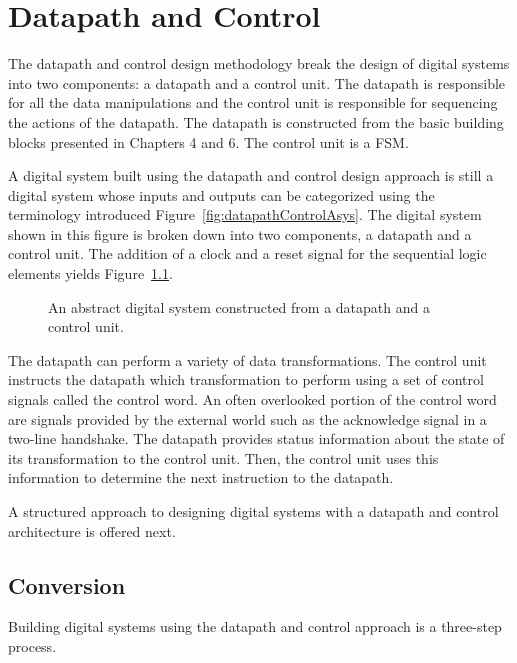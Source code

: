 \chapter{Datapath and Control}
\label{chapter:Datapath and Control}
\graphicspath{ {./chapter08/Fig} }

The datapath and control design methodology break the design
of digital systems into two components: a datapath and a control 
unit.  The datapath is responsible for all the data manipulations
and the control unit is responsible for sequencing the
actions of the datapath.  The datapath is constructed from the basic 
building blocks presented in Chapters 4 and 6.  The control unit is
a FSM.  

A digital system built using the datapath and control design approach
is still a digital system whose inputs and outputs can be categorized
using the terminology introduced Figure~\ref{fig:datapathControlAsys}.  The 
digital system shown in this figure is broken down into two components,
a datapath and a control unit.  The addition of a clock and a reset signal for the 
sequential logic elements yields Figure~\ref{fig:datapathControlAbstract}.

\begin{figure}[ht]
\caption{An abstract digital system constructed from a datapath and
a control unit.}
\label{fig:datapathControlAbstract}
\end{figure}
\label{page:Abstract}

The datapath can perform a variety of data transformations.  The control 
unit instructs the datapath which transformation to perform using a set 
of control signals called the control word.  An often overlooked portion 
of the control word are signals provided by the external world such as
the acknowledge signal in a two-line handshake.  The datapath 
provides status information about the state of its transformation to the 
control unit.  Then, the control unit uses this information to determine 
the next instruction to the datapath.

A structured approach to designing digital systems with a
datapath and control architecture is offered next.

\section{Conversion}
Building digital systems using the datapath and control approach is a
three-step process.

